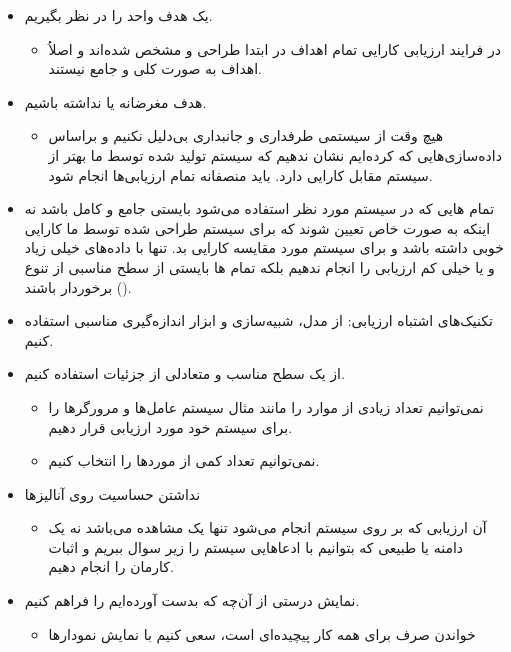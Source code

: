 \begin{itemize}
    \item یک هدف واحد را در نظر بگیریم.
    \begin{itemize}
        \item در فرایند ارزیابی کارایی تمام اهداف در ابتدا طراحی و مشخص شده‌اند
        و اصلاُ اهداف به صورت کلی و جامع نیستند.
    \end{itemize}
    \item هدف مغرضانه یا  نداشته باشیم.
    \begin{itemize}
        \item هیچ وقت از سیستمی طرفداری و جانبداری بی‌دلیل نکنیم و براساس
        داده‌سازی‌هایی که کرده‌ایم نشان ندهیم که سیستم تولید شده توسط ما بهتر از
        سیستم مقابل کارایی دارد. باید منصفانه تمام ارزیابی‌ها انجام شود.
    \end{itemize}
    \item تمام هایی که در سیستم مورد نظر استفاده می‌شود بایستی جامع
    و کامل باشد نه اینکه به صورت خاص تعیین شوند که برای سیستم طراحی شده توسط ما
    کارایی خوبی داشته باشد و برای سیستم مورد مقایسه کارایی بد. تنها با داده‌های
    خیلی زیاد و یا خیلی کم ارزیابی را انجام ندهیم بلکه تمام ها
    بایستی از سطح مناسبی از تنوع () برخوردار باشند.
    \item تکنیک‌های اشتباه ارزیابی: از مدل، شبیه‌سازی و ابزار اندازه‌گیری مناسبی
    استفاده کنیم.
    \item از یک سطح مناسب و متعادلی از جزئیات استفاده کنیم.
    \begin{itemize}
        \item نمی‌توانیم تعداد زیادی از موارد را مانند مثال سیستم عامل‌ها و
        مرورگر‌ها را برای سیستم خود مورد ارزیابی قرار دهیم.
        \item نمی‌توانیم تعداد کمی از مورد‌ها را انتخاب کنیم.
    \end{itemize}
    \item نداشتن حساسیت روی آنالیز‌ها
    \begin{itemize}
        \item آن ارزیابی‌ که بر روی سیستم انجام می‌شود تنها یک مشاهده می‌باشد نه
        یک دامنه یا  طبیعی که بتوانیم با ادعا‌هایی سیستم را زیر سوال
        ببریم و اثبات کارمان را انجام دهیم.
    \end{itemize}
    \item نمایش درستی از آن‌چه که بدست آورده‌ایم را فراهم کنیم.
    \begin{itemize}
        \item خواندن صرف برای همه کار پیچیده‌ای است، سعی کنیم با نمایش نمودار‌ها

\end{itemize}
\end{itemize}
